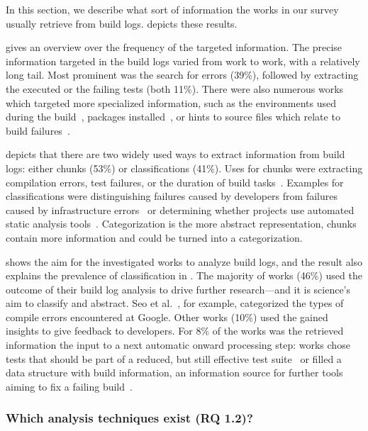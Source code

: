 \documentclass[10pt,journal,compsoc]{IEEEtran}
\begin{document}
In this section, we describe what sort of information the works in
our survey usually retrieve from build logs.
 depicts these results.

 gives an overview over the frequency of
the targeted information.
The precise information targeted in the build logs varied from work
to work, with a relatively long tail.
Most prominent was the search for errors (39\%), followed by extracting
the executed or the failing
tests (both 11\%).
There were also numerous works which targeted more specialized
information, such as the environments used during the
build~\cite{zolfagharinia2017not}, packages
installed~\cite{selberg2012use}, or hints to source files which
relate to build failures~\cite{ren2018automated}.

 depicts that there are two widely used ways to
extract information from build logs: either chunks (53\%) or
classifications (41\%).
Uses for chunks were extracting compilation errors,
test failures, or the duration of build
tasks~\cite{clemencic2014new,zhang2016android}.
Examples for
classifications were distinguishing failures caused by developers from
failures caused by infrastructure errors~\cite{lindqvist2019detection}
or determining whether projects use automated static analysis
tools~\cite{kavaler2019tool}.
Categorization is the more abstract representation, chunks
contain more information and could be turned into a categorization.

 shows the aim for the
investigated works to analyze build logs, and the result also explains
the prevalence of classification in .
The majority of works (46\%) used the outcome of their build log
analysis to drive further research---and it is science's aim to
classify and abstract.
Seo et al.~\cite{seo2014programmers}, for example,
categorized the types of compile errors encountered at
Google.
Other works (10\%) used the gained insights to give feedback to
developers.
For 8\% of the works was the retrieved information the input
to a next automatic onward processing step:
works chose
tests that should be part of a reduced, but still effective test
suite~\cite{shi2018evaluating} or filled     a data structure with
build information, an information source for further tools aiming
to fix a failing build~\cite{vassallo2018un-break}.

\subsubsection{Which analysis techniques exist (RQ 1.2)?}
\end{document}
